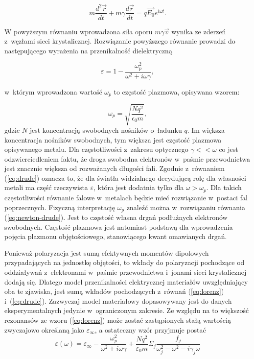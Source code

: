 \begin{equation}
m \frac{d^2\vec{r}}{dt} + m \gamma \frac{d\vec{r}}{dt} = q \vec{E_0}e^{i\omega t}.
\label{eq:newton-drude}
\end{equation}

W powyższym równaniu wprowadzona siła oporu $m \gamma \vec{v}$ wynika ze zderzeń z~węzłami sieci krystalicznej. Rozwiązanie powyższego równanie prowadzi do następującego wyrażenia na przenikalność dielektryczną

\begin{equation}
\varepsilon= 1 - \frac{\omega_p^2}{\omega^2+i\omega \gamma},
\label{eq:drude}
\end{equation}

w~którym wprowadzona wartość $\omega_p$ to częstość plazmowa, opisywana wzorem:

\begin{equation}
\omega_p = \sqrt{\frac{N q^2}{\epsilon_0 m}},
\label{eq:omega-plazmowa}
\end{equation}
gdzie $N$ jest koncentracją swobodnych nośników o~ładunku $q$. Im większa koncentracja nośników swobodnych, tym większa jest częstość plazmowa opisywanego metalu.  Dla częstotliwości z~zakresu optycznego $\gamma<<\omega$ co jest odzwierciedleniem faktu, że droga swobodna elektronów w~paśmie przewodnictwa jest znacznie większa od rozważanych długości fali. Zgodnie z~równaniem  (\ref{eq:drude}) oznacza to, że dla światła widzialnego decydującą rolę dla własności metali ma część rzeczywista $\varepsilon$, która jest dodatnia tylko dla $\omega>\omega_p$. Dla takich częstotliwości równanie falowe w~metalach będzie mieć rozwiązanie w~postaci fal poprzecznych. Fizyczną interpretację $\omega_p$ znaleźć można w~rozwiązaniu równania (\ref{eq:newton-drude}). Jest to częstość własna drgań podłużnych elektronów swobodnych. Częstość plazmowa jest natomiast podstawą dla wprowadzenia pojęcia plazmonu objętościowego, stanowiącego kwant omawianych drgań.

Ponieważ polaryzacja jest sumą efektywnych momentów dipolowych przypadających na jednostkę objętości, to wkłady do polaryzacji pochodzące od oddziaływań z~elektronami w~paśmie przewodnictwa i~jonami sieci krystalicznej dodają się. Dlatego model przenikalności elektrycznej materiałów uwzględniający oba te zjawiska, jest sumą wkładów pochodzących z~równań (\ref{eq:lorenz}) i~(\ref{eq:drude}). Zazwyczaj model materiałowy dopasowywany jest do danych eksperymentalnych jedynie w~ograniczonym zakresie. Ze względu na to większość rezonansów ze wzoru (\ref{eq:lorenz}) może zostać zastąpionych stałą wartością zwyczajowo określaną jako $\varepsilon_\infty$, a ostateczny wzór przyjmuje postać
\begin{equation}
\varepsilon(\omega)=\varepsilon_\infty- \frac{\omega_p^2}{\omega^2+i\omega\gamma} +\frac{Nq^2}{\varepsilon_0 m} \Sigma_j \frac{f_j}{\omega_j^2-\omega^2-i\gamma_j\omega}
\label{eq:lorenz-drude}
\end{equation}
